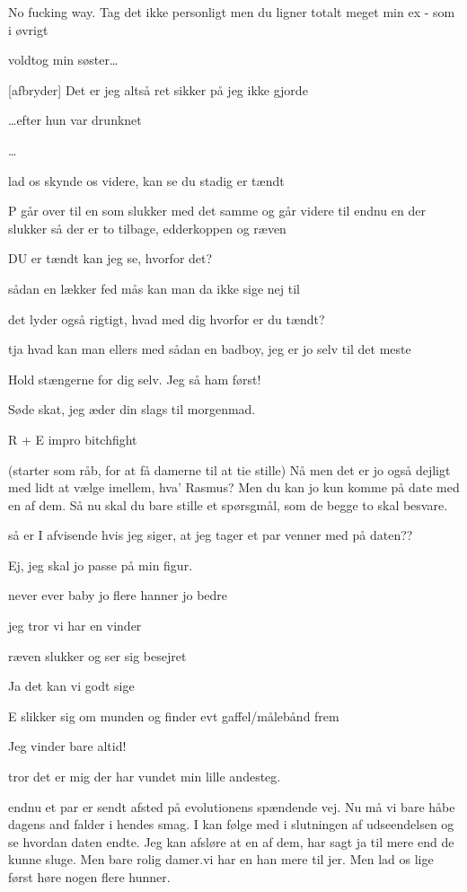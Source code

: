\documentclass[a4paper,11pt]{article}
\begin{document}
\begin{sketch}
 No fucking way. Tag det ikke personligt men du ligner totalt meget min ex - som i øvrigt 

voldtog min søster\ldots

[afbryder] Det er jeg altså ret sikker på jeg ikke gjorde

 \ldots efter hun var drunknet

\ldots

 lad os skynde os videre, kan se du stadig er tændt

\scene P går over til en som slukker med det samme og går videre til endnu en der slukker så der er to tilbage, edderkoppen og ræven

 DU er tændt kan jeg se, hvorfor det?

 sådan en lækker fed mås kan man da ikke sige nej til

 det lyder også rigtigt, hvad med dig hvorfor er du tændt?

 tja hvad kan man ellers med sådan en badboy, jeg er jo selv til det meste

 Hold stængerne for dig selv. Jeg så ham først!

 Søde skat, jeg æder din slags til morgenmad.

\scene R + E impro bitchfight

 (starter som råb, for at få damerne til at tie stille) Nå men det er jo også dejligt med lidt at vælge imellem, hva’ Rasmus? Men du kan jo kun komme på date med en af dem. Så nu skal du bare stille et spørsgmål, som de begge to skal besvare.

 så er I afvisende hvis jeg siger, at jeg tager et par venner med på daten??

 Ej, jeg skal jo passe på min figur.

 never ever baby jo flere hanner jo bedre

 jeg tror vi har en vinder

ræven slukker og ser sig besejret

 Ja det kan vi godt sige

\scene E slikker sig om munden og finder evt gaffel/målebånd frem

 Jeg vinder bare altid!

 tror det er mig der har vundet min lille andesteg.

 endnu et par er sendt afsted på evolutionens spændende vej. Nu må vi bare håbe dagens and falder i hendes smag. I kan følge med i slutningen af udseendelsen og se hvordan daten endte. Jeg kan afsløre at en af dem, har sagt ja til mere end de kunne sluge. Men bare rolig damer.vi har en han mere til jer. Men lad os lige først høre nogen flere hunner. 


\end{sketch}
\end{document}
